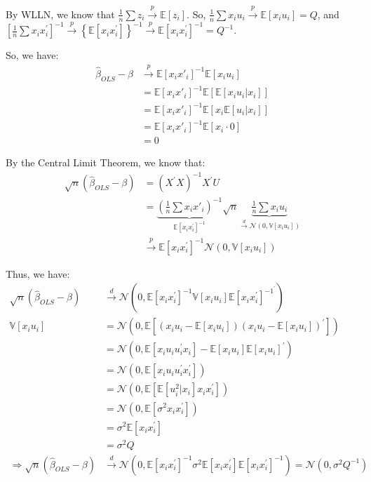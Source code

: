 \begin{note}
  By WLLN, we know that $\frac{1}{n}\sum{z_i} \overset{p}{\rightarrow} \mathbb{E}[z_i]$.
  So, $\frac{1}{n}\sum x_i u_i \overset{p}{\rightarrow} \mathbb{E}[x_i u_i] = Q$, and $\left[\frac{1}{n}\sum{x_i x^{\prime} _i}\right]^{-1} \overset{p}{\rightarrow} \left\{\mathbb{E}[x_i x^{\prime} _i]\right\}^{-1} \overset{p}{\rightarrow} \mathbb{E}[x_i x^{\prime} _i]^{-1} = Q^{-1} .$
\end{note}

So, we have:
\begin{align*}
  \hat{\beta}_{OLS} - \beta &\overset{p}{\rightarrow} \mathbb{E}[x_i x'_i]^{-1} \mathbb{E}[x_i u_i]\\
  &= \mathbb{E}[x_i x'_i]^{-1} \mathbb{E}[\mathbb{E}[x_i u_i | x_i]]\\
  &= \mathbb{E}[x_i x'_i]^{-1} \mathbb{E}[x_i \mathbb{E}[u_i | x_i]]\\
  &= \mathbb{E}[x_i x'_i]^{-1} \mathbb{E}[x_i \cdot 0]\\
  &= 0
\end{align*}

\begin{note}
  By the Central Limit Theorem, 
  we know that:
  \begin{align*}
    \sqrt{n}(\hat{\beta}_{OLS} - \beta) &= (X^{\prime} X)^{-1}X^{\prime} U \\
    &= \underset{\mathbb{E}[x_i x^{\prime} _i]^{-1}}{\underbrace{\left(\frac{1}{n}\sum x_i x'_i\right)^{-1}}} \sqrt{n} \underset{\overset{d}{\rightarrow} \mathcal{N}(0, \mathbb{V}[x_i u_i])}{\underbrace{\frac{1}{n}\sum x_i u_i}} \\
    & \overset{p}{\rightarrow} \mathbb{E}[x_i x^{\prime} _i]^{-1} \mathcal{N}(0, \mathbb{V}[x_i u_i])
  \end{align*}
\end{note}

Thus, we have:
\begin{align*}
  \sqrt{n}(\hat{\beta}_{OLS} - \beta) &\overset{d}{\rightarrow} \mathcal{N} (0, \mathbb{E}[x_i x^{\prime} _i]^{-1}\mathbb{V}[x_i u_i] \mathbb{E}[x_i x^{\prime} _i]^{-1^{\prime} } )\\
  \mathbb{V}[x_i u_i] &= \mathcal{N}(0, \mathbb{E}\left[(x_i u_i - \mathbb{E}[x_i u_i])(x_i u_i - \mathbb{E}[x_i u_i])^{\prime} \right]) \\
  &= \mathcal{N} (0, \mathbb{E}[x_i u_i u_i^{\prime} x_i] - \mathbb{E}[x_i u_i] \mathbb{E}[x_i u_i]^{\prime})\\
  &= \mathcal{N} (0, \mathbb{E}[x_i u_i u_i^{\prime} x_i^{\prime} ])\\
  &= \mathcal{N} (0, \mathbb{E}[\mathbb{E}[u_i^2 | x_i] x_i x_i^{\prime}])\\
  &= \mathcal{N} (0, \mathbb{E}[\sigma^2 x_i x_i^{\prime}])\\
  &= \sigma^2 \mathbb{E}[x_i x_i^{\prime}]\\
  &= \sigma ^2 Q \\
  \Rightarrow \sqrt{n}(\hat{\beta}_{OLS} - \beta) &\overset{d}{\rightarrow} \mathcal{N} (0, \mathbb{E}[x_i x^{\prime} _i]^{-1} \sigma^2 \mathbb{E}[x_i x_i^{\prime}] \mathbb{E}[x_i x^{\prime} _i]^{-1} ) = \mathcal{N} (0, \sigma^2 Q^{-1})
\end{align*}

